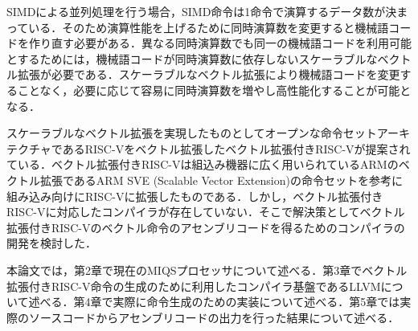 SIMDによる並列処理を行う場合，SIMD命令は1命令で演算するデータ数が決まっている．そのため演算性能を上げるために同時演算数を変更すると機械語コードを作り直す必要がある．異なる同時演算数でも同一の機械語コードを利用可能とするためには，機械語コードが同時演算数に依存しないスケーラブルなベクトル拡張が必要である．スケーラブルなベクトル拡張により機械語コードを変更することなく，必要に応じて容易に同時演算数を増やし高性能化することが可能となる．

スケーラブルなベクトル拡張を実現したものとしてオープンな命令セットアーキテクチャであるRISC-V\cite{bib:risc-v}をベクトル拡張したベクトル拡張付きRISC-V\cite{bib:kimura}が提案されている．ベクトル拡張付きRISC-Vは組込み機器に広く用いられているARMのベクトル拡張であるARM SVE (Scalable Vector Extension)\cite{bib:arm_sve}の命令セットを参考に組み込み向けにRISC-Vに拡張したものである．しかし，ベクトル拡張付きRISC-Vに対応したコンパイラが存在していない．そこで解決策としてベクトル拡張付きRISC-Vのベクトル命令のアセンブリコードを得るためのコンパイラの開発を検討した．

本論文では，第2章で現在のMIQSプロセッサについて述べる．第3章でベクトル拡張付きRISC-V命令の生成のために利用したコンパイラ基盤であるLLVM\cite{bib:llvm}について述べる．第4章で実際に命令生成のための実装について述べる．第5章では実際のソースコードからアセンブリコードの出力を行った結果について述べる．